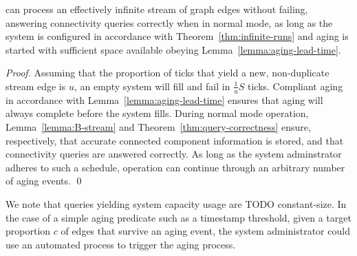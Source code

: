 \begin{theorem}
\XSCC can process an effectively infinite stream of graph edges without failing,
answering
connectivity queries correctly when in normal mode, as long as
the system is configured in accordance with Theorem~\ref{thm:infinite-runs}
and aging is started with sufficient space available obeying
Lemma~\ref{lemma:aging-lead-time}.
\end{theorem}
\begin{proof}
Assuming that the proportion of \XStream ticks that yield a new,
non-duplicate stream edge is $u$,
an empty system will fill and fail in $\frac{1}{u}S$ ticks. Compliant
aging in accordance with Lemma~\ref{lemma:aging-lead-time} ensures that
aging will always complete before the system fills.  During normal
mode operation, Lemma~\ref{lemma:B-stream} and 
Theorem~\ref{thm:query-correctness} ensure, respectively, that 
accurate connected
component information is stored, and that connectivity queries are
answered correctly.  As long as the
system adminstrator adheres to such a schedule, \XSCC operation
can continue through an arbitrary number of aging events. \qed
\end{proof}
We note that queries yielding system capacity usage are TODO constant-size. In
the case of a simple aging predicate such as a timestamp threshold,
given a target proportion $c$ of edges that survive an aging
event, the \XStream system administrator could use an automated process to
trigger the aging process.
